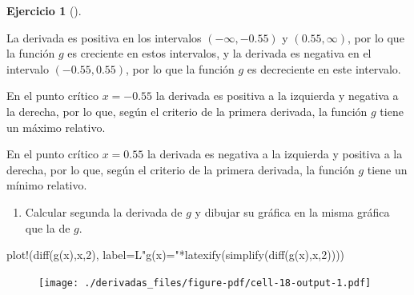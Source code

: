 \documentclass[
  a4paper,
]{scrreport}
\newenvironment{Shaded}{\begin{snugshade}}{\end{snugshade}}
\newcommand{\FloatTok}[1]{\textcolor[rgb]{0.68,0.00,0.00}{#1}}
\newcommand{\FunctionTok}[1]{\textcolor[rgb]{0.28,0.35,0.67}{#1}}
\newcommand{\NormalTok}[1]{\textcolor[rgb]{0.00,0.23,0.31}{#1}}
\newcommand{\OperatorTok}[1]{\textcolor[rgb]{0.37,0.37,0.37}{#1}}
\newcommand{\StringTok}[1]{\textcolor[rgb]{0.13,0.47,0.30}{#1}}
\providecommand{\tightlist}{%
  \setlength{\itemsep}{0pt}\setlength{\parskip}{0pt}}\usepackage{longtable,booktabs,array}
\theoremstyle{definition}
\newtheorem{exercise}{Ejercicio}[chapter]
\theoremstyle{remark}
\begin{document}
\begin{exercise}[]
\begin{tcolorbox}
La derivada es positiva en los intervalos \((-\infty,-0.55)\) y
\((0.55,\infty)\), por lo que la función \(g\) es creciente en estos
intervalos, y la derivada es negativa en el intervalo \((-0.55, 0.55)\),
por lo que la función \(g\) es decreciente en este intervalo.

En el punto crítico \(x=-0.55\) la derivada es positiva a la izquierda y
negativa a la derecha, por lo que, según el criterio de la primera
derivada, la función \(g\) tiene un máximo relativo.

En el punto crítico \(x=0.55\) la derivada es negativa a la izquierda y
positiva a la derecha, por lo que, según el criterio de la primera
derivada, la función \(g\) tiene un mínimo relativo.

\end{tcolorbox}

\begin{enumerate}
\def\labelenumi{\alph{enumi}.}
\setcounter{enumi}{4}
\tightlist
\item
  Calcular segunda la derivada de \(g\) y dibujar su gráfica en la misma
  gráfica que la de \(g\).
\end{enumerate}

\begin{tcolorbox}[enhanced jigsaw, toprule=.15mm, arc=.35mm, bottomrule=.15mm, titlerule=0mm, bottomtitle=1mm, opacitybacktitle=0.6, colbacktitle=quarto-callout-tip-color!10!white, colframe=quarto-callout-tip-color-frame, opacityback=0, title=\textcolor{quarto-callout-tip-color}{\faLightbulb}\hspace{0.5em}{Solución}, breakable, colback=white, toptitle=1mm, leftrule=.75mm, coltitle=black, rightrule=.15mm, left=2mm]

\begin{Shaded}
\begin{Highlighting}[]
\FunctionTok{plot!}\NormalTok{(}\FunctionTok{diff}\NormalTok{(}\FunctionTok{g}\NormalTok{(x),x,}\FloatTok{2}\NormalTok{), label}\OperatorTok{=}\NormalTok{L}\StringTok{"g\textquotesingle{}\textquotesingle{}(x)="}\FunctionTok{*latexify}\NormalTok{(}\FunctionTok{simplify}\NormalTok{(}\FunctionTok{diff}\NormalTok{(}\FunctionTok{g}\NormalTok{(x),x,}\FloatTok{2}\NormalTok{))))}
\end{Highlighting}
\end{Shaded}

\begin{figure}[H]

{\centering \texttt{[image: ./derivadas\_files/figure-pdf/cell-18-output-1.pdf]}

}
\end{figure}
\end{tcolorbox}
\end{exercise}
\end{document}
